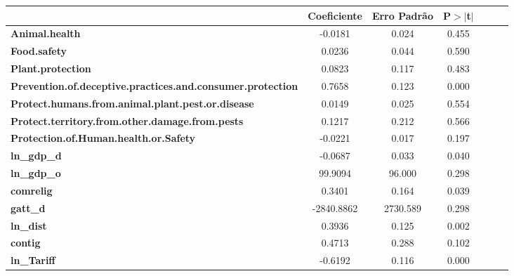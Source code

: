\begin{center}
\begin{tabular}{lcccccc}
                                                                   & \textbf{Coeficiente} & \textbf{Erro Padrão} &\textbf{P$> |$t$|$}\\
\midrule
\textbf{Animal.health}                                             &      -0.0181  &        0.024     &        0.455\\
\textbf{Food.safety}                                               &       0.0236  &        0.044     &        0.590\\
\textbf{Plant.protection}                                          &       0.0823  &        0.117     &        0.483\\
\textbf{Prevention.of.deceptive.practices.and.consumer.protection} &       0.7658  &        0.123     &        0.000\\
\textbf{Protect.humans.from.animal.plant.pest.or.disease}          &       0.0149  &        0.025     &        0.554\\
\textbf{Protect.territory.from.other.damage.from.pests}            &       0.1217  &        0.212     &        0.566\\
\textbf{Protection.of.Human.health.or.Safety}                      &      -0.0221  &        0.017     &        0.197\\
\textbf{ln\_gdp\_d}                                                &      -0.0687  &        0.033     &        0.040\\
\textbf{ln\_gdp\_o}                                                &      99.9094  &       96.000     &        0.298\\
\textbf{comrelig}                                                  &       0.3401  &        0.164     &        0.039\\
\textbf{gatt\_d}                                                   &   -2840.8862  &     2730.589     &        0.298\\
\textbf{ln\_dist}                                                  &       0.3936  &        0.125     &        0.002\\
\textbf{contig}                                                    &       0.4713  &        0.288     &        0.102\\
\textbf{ln\_Tariff}                                                &      -0.6192  &        0.116     &        0.000\\
\bottomrule
\end{tabular}
\end{center}